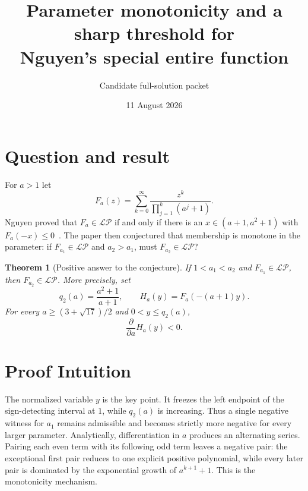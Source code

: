 \documentclass[11pt]{article}
\title{Parameter monotonicity and a sharp threshold for\\Nguyen's special entire function}
\author{Candidate full-solution packet}
\date{11 August 2026}
\newtheorem{theorem}{Theorem}
\newcommand{\LP}{\mathcal{L\!P}}
\begin{document}
\maketitle

\begin{center}
\end{center}

\section{Question and result}

For $a>1$ let
\[
 F_a(z)=\sum_{k=0}^{\infty}\frac{z^k}{\prod_{j=1}^k(a^j+1)}.
\]
Nguyen proved that $F_a\in\LP$ if and only if there is an
$x\in(a+1,a^2+1)$ with $F_a(-x)\leq0$~\cite[Theorem~1]{Nguyen}.
The paper then conjectured that membership is monotone in the parameter:
if $F_{a_1}\in\LP$ and $a_2>a_1$, must $F_{a_2}\in\LP$?

\begin{theorem}[Positive answer to the conjecture]\label{thm:main}
If $1<a_1<a_2$ and $F_{a_1}\in\LP$, then $F_{a_2}\in\LP$.
More precisely, set
\[
 q_2(a)=\frac{a^2+1}{a+1},\qquad
 H_a(y)=F_a(-(a+1)y).
\]
For every $a\geq(3+\sqrt{17})/2$ and $0<y\leq q_2(a)$,
\[
 \frac{\partial}{\partial a}H_a(y)<0.
\]
\end{theorem}

\section{Proof Intuition}

The normalized variable $y$ is the key point.  It freezes the left endpoint
of the sign-detecting interval at $1$, while $q_2(a)$ is increasing.  Thus a
single negative witness for $a_1$ remains admissible and becomes strictly
more negative for every larger parameter.  Analytically, differentiation in
$a$ produces an alternating series.  Pairing each even term with its following
odd term leaves a negative pair: the exceptional first pair reduces to one
explicit positive polynomial, while every later pair is dominated by the
exponential growth of $a^{k+1}+1$.  This is the monotonicity mechanism.
\end{document}
